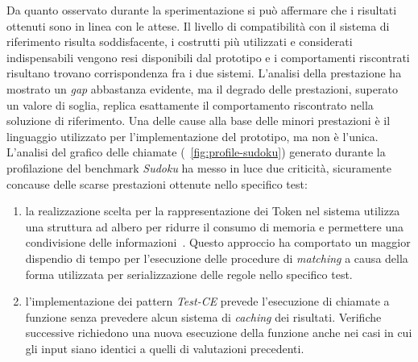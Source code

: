 Da quanto osservato durante la sperimentazione si può affermare che i risultati ottenuti sono in linea con le attese. Il livello di compatibilità con il sistema di riferimento risulta soddisfacente, i costrutti più utilizzati e considerati indispensabili vengono resi disponibili dal prototipo e i comportamenti riscontrati risultano trovano corrispondenza fra i due sistemi. L'analisi della prestazione ha mostrato un \emph{gap} abbastanza evidente, ma il degrado delle prestazioni, superato un valore di soglia, replica esattamente il comportamento riscontrato nella soluzione di riferimento. Una delle cause alla base delle minori prestazioni è il linguaggio utilizzato per l'implementazione del prototipo, ma non è l'unica. L'analisi del grafico delle chiamate (\figurename~\ref{fig:profile-sudoku}) generato durante la profilazione del benchmark \emph{Sudoku} ha messo in luce due criticità, sicuramente concause delle scarse prestazioni ottenute nello specifico test:
\begin{enumerate}
	\item la realizzazione scelta per la rappresentazione dei Token nel sistema utilizza una struttura ad albero per ridurre il consumo di memoria e permettere una condivisione delle informazioni~\cite{Doorenbos95productionmatching}. Questo approccio ha comportato un maggior dispendio di tempo per l'esecuzione delle procedure di \emph{matching} a causa della forma utilizzata per serializzazione delle regole nello specifico test.
	
	\item l'implementazione dei pattern \emph{Test-CE} prevede l'esecuzione di chiamate a funzione senza prevedere alcun sistema di \emph{caching} dei risultati. Verifiche successive richiedono una nuova esecuzione della funzione anche nei casi in cui gli input siano identici a quelli di valutazioni precedenti.
\end{enumerate}





